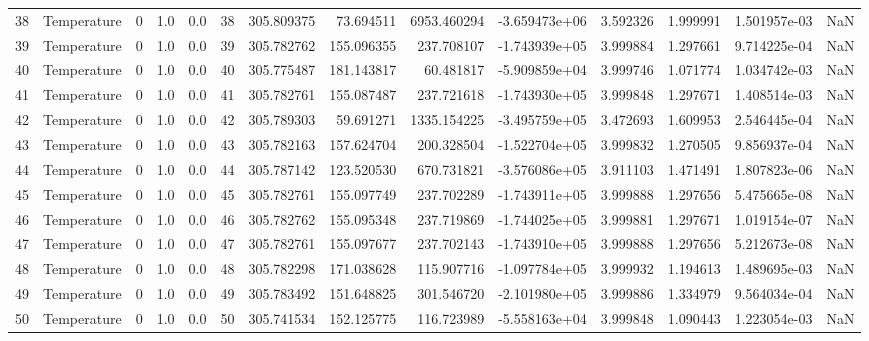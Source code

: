 \begin{tabular}{llrrrrrrrrrrrr}
38  &  Temperature &       0 &  1.0 &  0.0 &   38 &  305.809375 &    73.694511 &    6953.460294 & -3.659473e+06 &  3.592326 &  1.999991 &  1.501957e-03 &      NaN \\
39  &  Temperature &       0 &  1.0 &  0.0 &   39 &  305.782762 &   155.096355 &     237.708107 & -1.743939e+05 &  3.999884 &  1.297661 &  9.714225e-04 &      NaN \\
40  &  Temperature &       0 &  1.0 &  0.0 &   40 &  305.775487 &   181.143817 &      60.481817 & -5.909859e+04 &  3.999746 &  1.071774 &  1.034742e-03 &      NaN \\
41  &  Temperature &       0 &  1.0 &  0.0 &   41 &  305.782761 &   155.087487 &     237.721618 & -1.743930e+05 &  3.999848 &  1.297671 &  1.408514e-03 &      NaN \\
42  &  Temperature &       0 &  1.0 &  0.0 &   42 &  305.789303 &    59.691271 &    1335.154225 & -3.495759e+05 &  3.472693 &  1.609953 &  2.546445e-04 &      NaN \\
43  &  Temperature &       0 &  1.0 &  0.0 &   43 &  305.782163 &   157.624704 &     200.328504 & -1.522704e+05 &  3.999832 &  1.270505 &  9.856937e-04 &      NaN \\
44  &  Temperature &       0 &  1.0 &  0.0 &   44 &  305.787142 &   123.520530 &     670.731821 & -3.576086e+05 &  3.911103 &  1.471491 &  1.807823e-06 &      NaN \\
45  &  Temperature &       0 &  1.0 &  0.0 &   45 &  305.782761 &   155.097749 &     237.702289 & -1.743911e+05 &  3.999888 &  1.297656 &  5.475665e-08 &      NaN \\
46  &  Temperature &       0 &  1.0 &  0.0 &   46 &  305.782762 &   155.095348 &     237.719869 & -1.744025e+05 &  3.999881 &  1.297671 &  1.019154e-07 &      NaN \\
47  &  Temperature &       0 &  1.0 &  0.0 &   47 &  305.782761 &   155.097677 &     237.702143 & -1.743910e+05 &  3.999888 &  1.297656 &  5.212673e-08 &      NaN \\
48  &  Temperature &       0 &  1.0 &  0.0 &   48 &  305.782298 &   171.038628 &     115.907716 & -1.097784e+05 &  3.999932 &  1.194613 &  1.489695e-03 &      NaN \\
49  &  Temperature &       0 &  1.0 &  0.0 &   49 &  305.783492 &   151.648825 &     301.546720 & -2.101980e+05 &  3.999886 &  1.334979 &  9.564034e-04 &      NaN \\
50  &  Temperature &       0 &  1.0 &  0.0 &   50 &  305.741534 &   152.125775 &     116.723989 & -5.558163e+04 &  3.999848 &  1.090443 &  1.223054e-03 &      NaN \\

\end{tabular}
